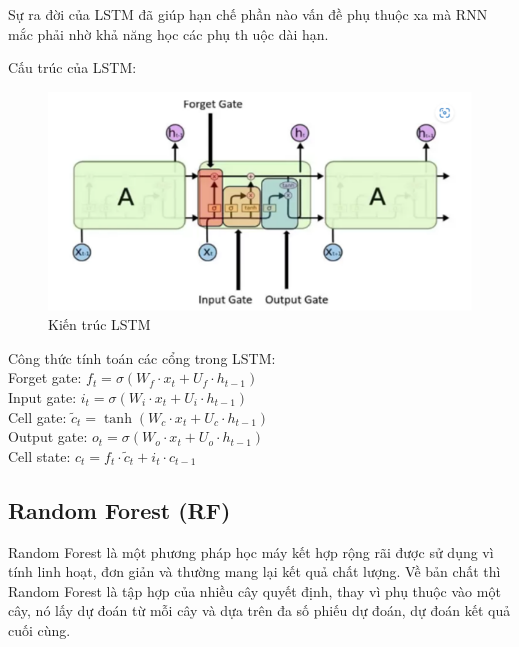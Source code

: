 \documentclass[conference]{IEEEtran}
\begin{document}
Sự ra đời của LSTM đã giúp hạn chế phần nào vấn đề phụ thuộc xa mà RNN mắc phải nhờ khả năng học các phụ th uộc dài hạn.

Cấu trúc của LSTM:
\begin{figure}[H]
    \centering
    \begin{minipage}{0.5\textwidth}
    \centering
    \includegraphics[width=1\textwidth]{Image/LSTM.png}
    \caption{Kiến trúc LSTM}
    \label{fig:1}
    \end{minipage}
\end{figure}
Công thức tính toán các cổng trong LSTM:\\
Forget gate: $f_t = \sigma(W_f \cdot x_t + U_f \cdot h_{t-1})$\\
Input gate: $i_t = \sigma(W_i \cdot x_t + U_i \cdot h_{t-1})$\\
Cell gate: $\tilde{c}_t = \tanh(W_c \cdot x_t + U_c \cdot h_{t-1})$\\
Output gate: $o_t = \sigma(W_o \cdot x_t + U_o \cdot h_{t-1})$\\
Cell state: $c_t = f_t \cdot \tilde{c}_t + i_t \cdot c_{t-1}$
\subsection{Random Forest (RF)}
Random Forest là một phương pháp học máy kết hợp rộng rãi được sử dụng vì tính linh hoạt, đơn giản và thường mang lại kết quả chất lượng. Về bản chất thì Random Forest là tập hợp của nhiều cây quyết định, thay vì phụ thuộc vào một cây, nó lấy dự đoán từ mỗi cây và dựa trên đa số phiếu dự đoán, dự đoán kết quả cuối cùng.
\end{document}

